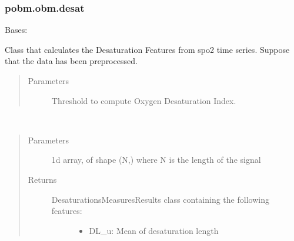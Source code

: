 \documentclass[letterpaper,10pt,english]{sphinxmanual}
\begin{document}
\subsubsection{pobm.obm.desat}
\label{\detokenize{pobm.obm:module-pobm.obm.desat}}\label{\detokenize{pobm.obm:pobm-obm-desat}}

\begin{fulllineitems}
\label{\detokenize{pobm.obm:pobm.obm.desat.DesaturationsMeasures}}
Bases: 

Class that calculates the Desaturation Features from spo2 time series.
Suppose that the data has been preprocessed.
\begin{quote}\begin{description}
\item[{Parameters}] \leavevmode
{} \textendash{} Threshold to compute Oxygen Desaturation Index.

\end{description}\end{quote}

\begin{fulllineitems}
\label{\detokenize{pobm.obm:pobm.obm.desat.DesaturationsMeasures.compute}}~\begin{quote}\begin{description}
\item[{Parameters}] \leavevmode
{} \textendash{} 1\sphinxhyphen{}d array, of shape (N,) where N is the length of the signal

\item[{Returns}] \leavevmode
\begin{description}
\item[{DesaturationsMeasuresResults class containing the following features:}] \leavevmode\begin{itemize}
\item {} 
DL\_u: Mean of desaturation length


\end{itemize}
\end{description}
\end{description}
\end{quote}
\end{fulllineitems}
\end{fulllineitems}
\end{document}
